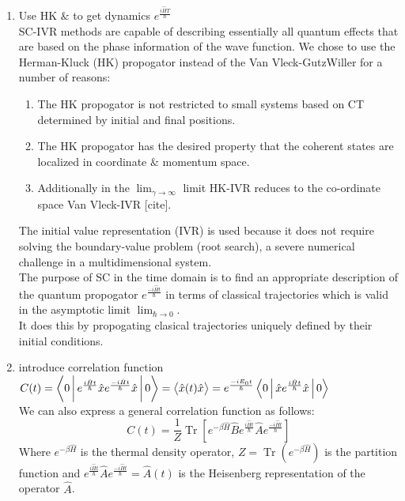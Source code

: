 \documentclass[12pt,letterpaper,oneside,final,titlepage]{article}               %
\numberwithin{equation}{section} %
\DeclareMathOperator{\Tr}{Tr}
\begin{document}
\begin{enumerate}
	\item Use HK $\&$ to get dynamics $e^{\frac{i\hat{H}T}{\hbar}}$ \\
	SC-IVR methods are capable of describing essentially all quantum effects that are based on the phase information of the wave function.
	We chose to use the Herman-Kluck (HK) propogator instead of the Van Vleck-GutzWiller for a number of reasons:
	\begin{enumerate}
		\item The HK propogator is not restricted to small systems based on CT determined by initial and final positions.
		\item The HK propogator has the desired property that the coherent states are localized in coordinate $\&$ momentum space.
		\item Additionally in the $\lim_{\gamma \to \infty}$ limit HK-IVR reduces to the co-ordinate space Van Vleck-IVR [cite]. 
	\end{enumerate}
	The initial value representation (IVR) is used because it does not require solving the boundary-value problem (root search), a severe numerical challenge in a multidimensional system. \\
	The purpose of SC in the time domain is to find an appropriate description of the quantum propogator $e^{\frac{-i\hat{H}t}{\hbar}}$ 
	in terms of classical trajectories which is valid in the asymptotic limit $\lim_{\hbar \to 0}$. \\
	It does this by propogating clasical trajectories uniquely defined by their initial conditions.

	\item introduce correlation function $C(t) = \Braket{0|e^{\frac{i\hat{H}t}{\hbar}}\hat{x}e^{\frac{-i\hat{H}t}{\hbar}}\hat{x}|0} 
											   = \Braket{\hat{x}(t)\hat{x}} 
											   = e^{\frac{-iE_{0}t}{\hbar}}\Braket{0|\hat{x}e^{\frac{i\hat{H}t}{\hbar}}\hat{x}|0}$\\
	We can also express a general correlation function as follows:
	\begin{equation}
		C(t) = \frac{1}{Z}\Tr[e^{-\beta\hat{H}}\hat{B}e^{\frac{i\hat{H}t}{\hbar}}\hat{A}e^{\frac{-i\hat{H}t}{\hbar}}]
	\end{equation}
	Where $e^{-\beta\hat{H}}$ is the thermal density operator, $Z = \Tr(e^{-\beta\hat{H}})$ is the partition function and $e^{\frac{i\hat{H}t}{\hbar}}\hat{A}e^{\frac{-i\hat{H}t}{\hbar}}=\hat{A}(t)$ is the Heisenberg representation of the operator $\hat{A}$.


\end{enumerate}
\end{document}
